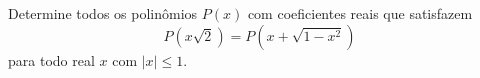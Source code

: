 Determine todos os polinômios \(P(x)\) com coeficientes reais que satisfazem
\[P(x\sqrt{2})=P(x+\sqrt{1-x^2})\]
para todo real \(x\) com \(\left|x\right|\leq1\).
